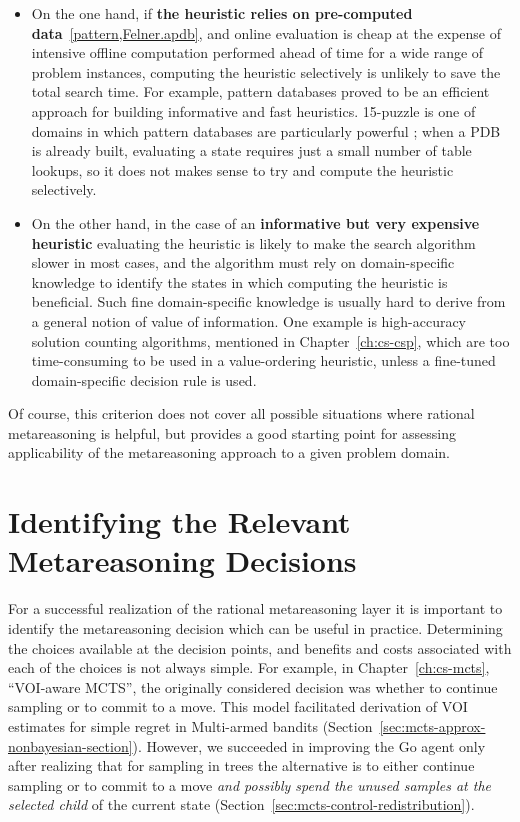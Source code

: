 \begin{itemize}
\item On the one hand, if \textbf{the heuristic relies on pre-computed
  data}~\ref{pattern,Felner.apdb}, and online evaluation is cheap at the expense of intensive
  offline computation performed ahead of time for a wide
  range of problem instances, computing the heuristic selectively is
  unlikely to save the total search time. For example, pattern
  databases \cite{pattern} proved to be an efficient approach for
  building informative and fast heuristics. 15-puzzle is one of
  domains in which pattern databases are particularly powerful
  \cite{Felner.apdb}; when a PDB is already built,  evaluating a state
  requires  just a small number of table lookups, so it does not makes sense to try and
  compute the heuristic selectively.
\item On the other hand, in the case of an \textbf{informative but
  very expensive heuristic} evaluating the heuristic is likely 
  to make the search algorithm slower in most cases, and the
  algorithm must rely on domain-specific knowledge to
  identify the states in which computing the heuristic is beneficial. 
  Such fine domain-specific knowledge is usually hard to derive from
  a general notion of value of information. One example is
  high-accuracy solution counting algorithms, mentioned in
  Chapter~\ref{ch:cs-csp}, which are too time-consuming to be used
  in a value-ordering heuristic, unless a fine-tuned domain-specific
  decision rule is used.
\end{itemize}

Of course, this criterion does not cover all possible situations where
rational metareasoning is helpful, but provides a good starting point
for assessing applicability of the metareasoning approach to a given
problem domain.

\section{Identifying the Relevant Metareasoning Decisions}

For a successful realization of the rational metareasoning layer it is
important to identify the metareasoning decision which can be useful
in practice. Determining the
choices available at the decision points, and benefits and costs
associated with each of the choices is not always simple. For example,
in Chapter~\ref{ch:cs-mcts}, ``VOI-aware MCTS'', the originally
considered decision was whether to continue sampling or to commit to a
move. This model facilitated derivation of VOI estimates for simple
regret in Multi-armed bandits
(Section~\ref{sec:mcts-approx-nonbayesian-section}). However, we
succeeded in improving the Go agent only after realizing that for sampling in trees
the alternative is to either continue sampling or to commit to a move
\emph{and possibly spend the unused samples at the selected child} of
the current state (Section~\ref{sec:mcts-control-redistribution}).


